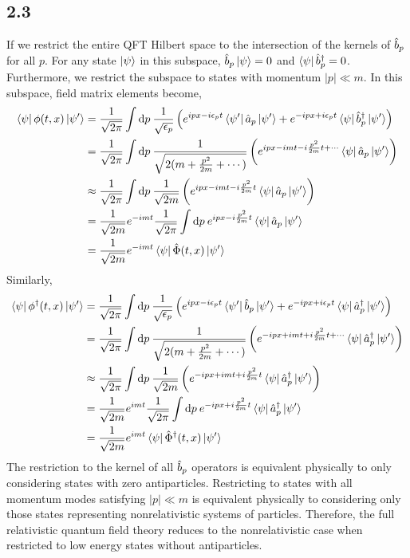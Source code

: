\documentclass[12pt]{extarticle}
\newcommand{\field}{\hat{\Phi}}
\newcommand{\dfield}{\hat{\Phi}^\dagger}
\begin{document}
\subsection*{2.3}

If we restrict the entire QFT Hilbert space to the intersection of the kernels of $\hat{b}_p$ for all $p$. For any state $\left| \psi \right>$ in this subspace, $\hat{b}_p \left| \psi \right> = 0$ and $\left< \psi \right| \hat{b}^\dagger_p = 0$. Furthermore, we restrict the subspace to states with momentum $|p| \ll m$. In this subspace, field matrix elements become,
\begin{align*}
\bra{\psi} \phi(t, x) \ket{\psi'} & = \frac{1}{\sqrt{2\pi}} \int \d{p} \frac{1}{\sqrt{\epsilon_p}} \left( e^{i p x - i \epsilon_p t} \bra{\psi'} \a_p \ket{\psi'} + e^{- i p x + i \epsilon_p t} \bra{\psi} \bdag_p  \ket{\psi'} \right)
\\
& = \frac{1}{\sqrt{2\pi}} \int \d{p} \frac{1}{\sqrt{2(m + \frac{p^2}{2m} + \cdots)}} \left( e^{i p x - i m t - i \frac{p^2}{2m} t + \cdots } \bra{\psi} \a_p \ket{\psi'} \right)
\\
& \approx \frac{1}{\sqrt{2\pi}} \int \d{p} \frac{1}{\sqrt{2m}} \left( e^{i p x - i m t - i \frac{p^2}{2m} t } \bra{\psi} \a_p \ket{\psi'} \right)
\\
& = \frac{1}{\sqrt{2m}} e^{- i m t} \frac{1}{\sqrt{2 \pi}}  \int \d{p} e^{i p x - i \frac{p^2}{2m} t } \bra{\psi} \a_p \ket{\psi'} 
\\
& = \frac{1}{\sqrt{2m}} e^{- i m t} \bra{\psi} \field(t, x) \ket{\psi'} 
\end{align*}
Similarly,
\begin{align*}
\bra{\psi} \phi^\dagger(t, x) \ket{\psi'} & = \frac{1}{\sqrt{2\pi}} \int \d{p} \frac{1}{\sqrt{\epsilon_p}} \left( e^{i p x - i \epsilon_p t} \bra{\psi'} \b_p \ket{\psi'} + e^{- i p x + i \epsilon_p t} \bra{\psi} \adag_p  \ket{\psi'} \right)
\\
& = \frac{1}{\sqrt{2\pi}} \int \d{p} \frac{1}{\sqrt{2(m + \frac{p^2}{2m} + \cdots)}} \left( e^{-i p x + i m t + i \frac{p^2}{2m} t + \cdots } \bra{\psi} \adag_p \ket{\psi'} \right)
\\
& \approx \frac{1}{\sqrt{2\pi}} \int \d{p} \frac{1}{\sqrt{2m}} \left( e^{-i p x + i m t + i \frac{p^2}{2m} t } \bra{\psi} \adag_p \ket{\psi'} \right)
\\
& = \frac{1}{\sqrt{2m}} e^{i m t} \frac{1}{\sqrt{2 \pi}}  \int \d{p} e^{- i p x + i \frac{p^2}{2m} t } \bra{\psi} \adag_p \ket{\psi'} 
\\
& = \frac{1}{\sqrt{2m}} e^{i m t} \bra{\psi} \dfield(t, x) \ket{\psi'} 
\end{align*}
The restriction to the kernel of all $\hat{b}_p$ operators is equivalent physically to only considering states with zero antiparticles. Restricting to states with all momentum modes satisfying $|p| \ll m$ is equivalent physically to considering only those states representing nonrelativistic systems of particles. Therefore, the full relativistic quantum field theory reduces to the nonrelativistic case when restricted to low energy states without antiparticles. 
\end{document}
